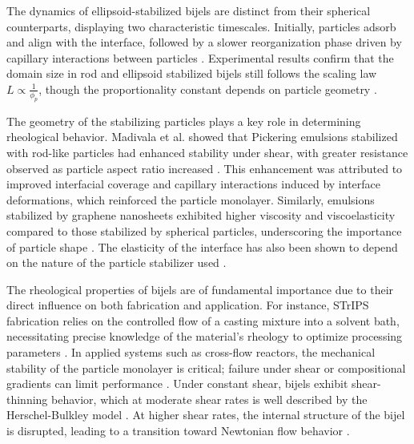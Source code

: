 The dynamics of ellipsoid-stabilized bijels are distinct from their spherical counterparts, displaying two characteristic timescales. Initially, particles adsorb and align with the interface, 
followed by a slower reorganization phase driven by capillary interactions between particles \cite{gunther_timescales_2014}. Experimental results confirm that the domain size in rod and ellipsoid stabilized 
bijels still follows the scaling law $L \propto \frac{1}{\phi_p}$, though the proportionality constant depends on particle geometry \cite{hijnen_bijels_2015, madivala_exploiting_2009, daware_emulsions_2015}.

The geometry of the stabilizing particles plays a key role in determining rheological behavior. Madivala et al. showed that Pickering emulsions stabilized with rod-like particles had enhanced stability under 
shear, with greater resistance observed as particle aspect ratio increased \cite{madivala_exploiting_2009}. This enhancement was attributed to improved interfacial coverage and capillary interactions induced by 
interface deformations, which reinforced the particle monolayer. Similarly, emulsions stabilized by graphene nanosheets exhibited higher viscosity and viscoelasticity compared to those stabilized by spherical 
particles, underscoring the importance of particle shape \cite{imperiali_simple_2014}. The elasticity of the interface has also been shown to depend on the nature of the particle stabilizer used 
\cite{sun_assembly_2013}.

The rheological properties of bijels are of fundamental importance due to their direct influence on both fabrication and application. For instance, STrIPS fabrication relies on the controlled flow of a 
casting mixture into a solvent bath, necessitating precise knowledge of the material's rheology to optimize processing parameters \cite{haase_situ_2016, haase_continuous_2015}. In applied systems such as 
cross-flow reactors, the mechanical stability of the particle monolayer is critical; failure under shear or compositional gradients can limit performance \cite{boakye-ansah_controlling_2020}. Under constant 
shear, bijels exhibit shear-thinning behavior, which at moderate shear rates is well described by the Herschel-Bulkley model \cite{macmillan_rheological_2019, wang_morphology_2023}. At higher shear rates, the 
internal structure of the bijel is disrupted, leading to a transition toward Newtonian flow behavior \cite{cai_bijels_2017, bonaccorso_shear_2020}.

